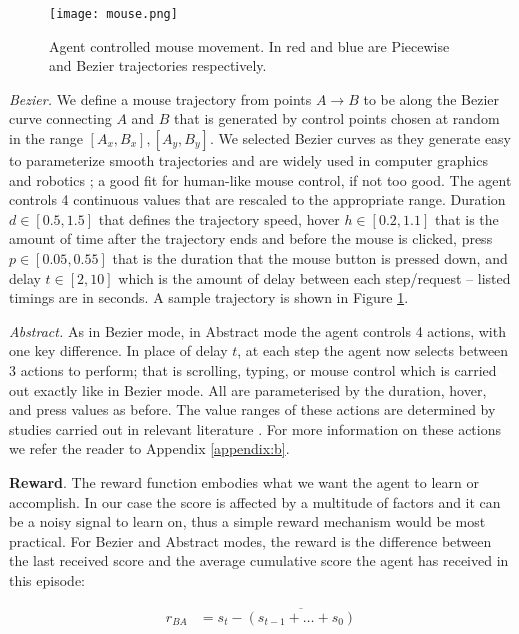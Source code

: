 \begin{figure}
\centerline{\texttt{[image: mouse.png]}}
\caption{Agent controlled mouse movement. In red and blue are Piecewise and Bezier trajectories respectively.}
\label{mouse}
\end{figure}

\emph{Bezier.} We define a mouse trajectory from points $A \rightarrow B$ to be along the Bezier curve connecting $A$ and $B$ that is generated by control points chosen at random in the range $[A_x,B_x], [A_y,B_y]$.
We selected Bezier curves as they generate easy to parameterize smooth trajectories and are widely used in computer graphics and robotics \cite{tharwat2019intelligent, wang2020using}; a good fit for human-like mouse control, if not too good.
The agent controls 4 continuous values that are rescaled to the appropriate range.
Duration $d \in [0.5,1.5]$ that defines the trajectory speed, hover $h \in [0.2,1.1]$ that is the amount of time after the trajectory ends and before the mouse is clicked, press $p \in [0.05,0.55]$ that is the duration that the mouse button is pressed down, and delay $t \in [2,10]$ which is the amount of delay between each step/request -- listed timings are in seconds.
A sample trajectory is shown in Figure \ref{mouse}.

\emph{Abstract.} As in Bezier mode, in Abstract mode the agent controls 4 actions, with one key difference.
In place of delay $t$, at each step the agent now selects between 3 actions to perform; that is scrolling, typing, or mouse control which is carried out exactly like in Bezier mode.
All are parameterised by the duration, hover, and press values as before.
The value ranges of these actions are determined by studies carried out in relevant literature \cite{dhakal2018observations, katerina2018mouse}.
For more information on these actions we refer the reader to Appendix \ref{appendix:b}.

\textbf{Reward}. The reward function embodies what we want the agent to learn or accomplish.
In our case the score is affected by a multitude of factors and it can be a noisy signal to learn on, thus a simple reward mechanism would be most practical.
For Bezier and Abstract modes, the reward is the difference between the last received score and the average cumulative score the agent has received in this episode:

\begin{equation}
\begin{aligned}
    r_{BA} &= s_t-\overline{(s_{t-1}+\dots+s_0)}\\
\end{aligned}
\label{eqn:reward}
\end{equation}

